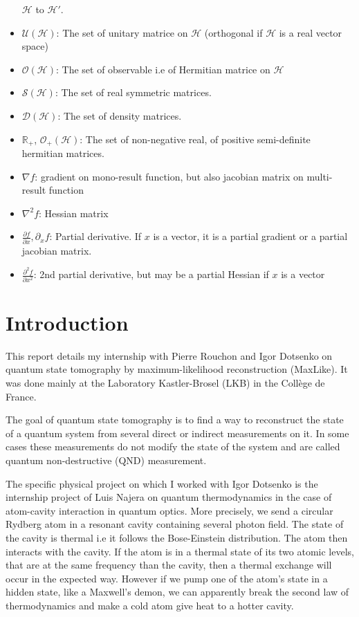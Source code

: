 \documentclass[10pt,a4paper]{report}
\theoremstyle{plain}
\theoremstyle{definition}
\theoremstyle{remark}
\newcommand{\R}{\ensuremath{\mathbb{R}}}
\newcommand{\dpar}[2]{\frac{\partial{#1}}{\partial{#2}}}
\newcommand{\dparn}[3]{\frac{\partial^{#3} {#1}}{\partial{#2}^{#3}}}
\begin{document}
\begin{itemize}
    $\mathcal{H}$ to $\mathcal{H}'$.
  \item $\mathcal{U}(\mathcal{H})$: The set of unitary matrice on $\mathcal{H}$
    (orthogonal if $\mathcal{H}$ is a real vector space)
  \item $\mathcal{O}(\mathcal{H})$: The set of observable i.e of Hermitian matrice on $\mathcal{H}$
  \item $\mathcal{S}(\mathcal{H})$: The set of real symmetric matrices.
  \item $\mathcal{D}(\mathcal{H})$: The set of density matrices.
  \item $\R_+$, $\mathcal{O}_+(\mathcal{H})$: The set of non-negative real, of
    positive semi-definite hermitian matrices.
  \item $\nabla f$: gradient on mono-result function, but also jacobian matrix
    on multi-result function
  \item $\nabla^2 f$: Hessian matrix
  \item $\dpar f x, \partial_x f$: Partial derivative. If $x$ is a vector, it is
    a partial gradient or a partial jacobian matrix.
  \item $\dparn f x 2$: 2nd partial derivative, but may be a partial Hessian if
    $x$ is a vector
\end{itemize}

\tableofcontents

\chapter*{Introduction}

This report details my internship with Pierre Rouchon and Igor Dotsenko on
quantum state tomography by maximum-likelihood reconstruction (MaxLike). It was done mainly at
the Laboratory Kastler-Brosel (LKB) in the Collège de France.

The goal of quantum state tomography is to find a way to reconstruct the state of
a quantum system from several direct or indirect measurements on it. In some cases
these measurements do not modify the state of the system and are called
quantum non-destructive (QND) measurement.

The specific physical project on which I worked with Igor Dotsenko is the
internship project of Luis Najera on quantum thermodynamics in the case of
atom-cavity interaction in quantum optics. More precisely, we send a circular
Rydberg atom in a resonant cavity containing several photon field. The state of the cavity is
thermal i.e it follows the Bose-Einstein distribution. The atom then interacts
with the cavity. If the atom is in a thermal state of its two atomic levels, that
are at the same frequency than the cavity, then a thermal exchange will occur in
the expected way. However if we pump one of the atom's state in a hidden
state, like a Maxwell's demon, we can apparently break the second law of thermodynamics and make
a cold atom give heat to a hotter cavity.
\end{document}
